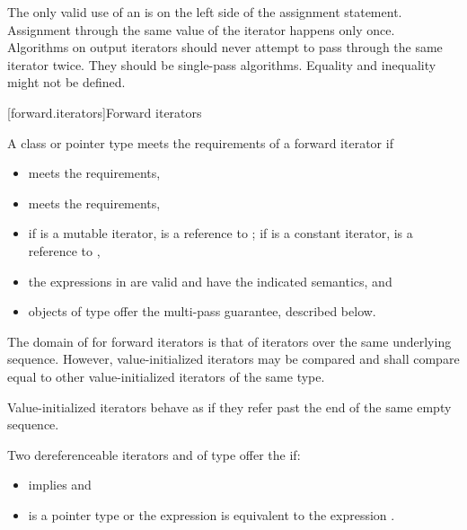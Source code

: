 \pnum
\begin{note}
The only valid use of an
is on the left side of the assignment statement.
Assignment through the same value of the iterator happens only once.
Algorithms on output iterators should never attempt to pass through the same iterator twice.
They should be single-pass algorithms.
Equality and inequality might not be defined.
\end{note}

[forward.iterators]{Forward iterators}

\pnum
A class or pointer type
meets the requirements of a forward iterator if
\begin{itemize}
\item {} meets the  requirements,

\item {} meets the 
requirements,

\item if  is a mutable iterator,  is a reference to ;
if  is a constant iterator,  is a reference to ,

\item the expressions in 
are valid and have the indicated semantics, and

\item objects of type  offer the multi-pass guarantee, described below.
\end{itemize}

\pnum
The domain of \tcode{==} for forward iterators is that of iterators over the same
underlying sequence. However, value-initialized iterators may be compared and
shall compare equal to other value-initialized iterators of the same type.
\begin{note}
Value-initialized iterators behave as if they refer past the end of
the same empty sequence.
\end{note}

\pnum
Two dereferenceable iterators  and  of type  offer the
 if:
\begin{itemize}
\item {} implies  and
\item {} is a pointer type or the expression
 is equivalent to the expression .
\end{itemize}

